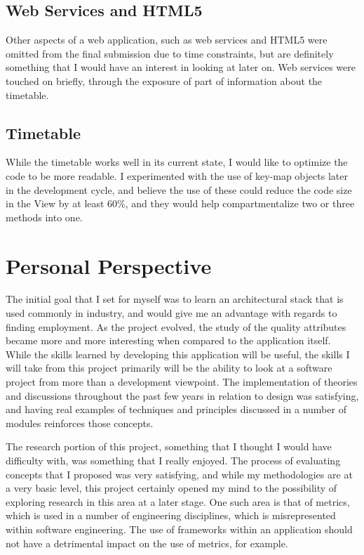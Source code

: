 \subsection{Web Services and HTML5}
Other aspects of a web application, such as web services and HTML5 were omitted from the final submission due to time constraints, but are definitely something that I would have an interest in looking at later on. Web services were touched on briefly, through the exposure of part of information about the timetable. 

\subsection{Timetable}
While the timetable works well in its current state, I would like to optimize the code to be more readable. I experimented with the use of key-map objects later in the development cycle, and believe the use of these could reduce the code size in the View by at least 60\%, and they would help compartmentalize two or three methods into one.

\section{Personal Perspective}

The initial goal that I set for myself was to learn an architectural stack that is used commonly in industry, and would give me an advantage with regards to finding employment. As the project evolved, the study of the quality attributes became more and more interesting when compared to the application itself. While the skills learned by developing this application will be useful, the skills I will take from this project primarily will be the ability to look at a software project from more than a development viewpoint. The implementation of theories and discussions throughout the past few years in relation to design was satisfying, and having real examples of techniques and principles discussed in a number of modules reinforces those concepts.

The research portion of this project, something that I thought I would have difficulty with, was something that I really enjoyed. The process of evaluating concepts that I proposed was very satisfying, and while my methodologies are at a very basic level, this project certainly opened my mind to the possibility of exploring research in this area at a later stage. One such area is that of metrics, which is used in a number of engineering disciplines, which is misrepresented within software engineering. The use of frameworks within an application should not have a detrimental impact on the use of metrics, for example. 

 